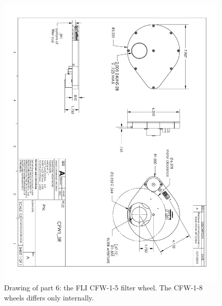 \begin{figure}
\begin{center}
\includegraphics[angle=180,width=0.9\linewidth]{figures/huitzi-f20-part-6.pdf}
\end{center}
\caption{Drawing of part 6: the FLI CFW-1-5 filter wheel. The CFW-1-8 wheels differs only internally.}
\label{figure:huitzi-f20-part-6}
\end{figure}

